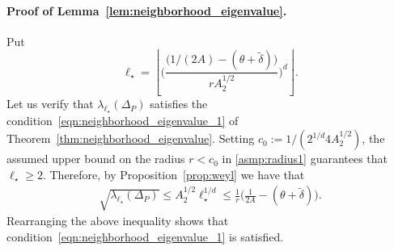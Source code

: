 \documentclass[twoside]{article}
\newcommand{\floor}[1]{\left\lfloor #1 \right\rfloor}
\newcommand{\1}{\mathbf{1}}
\newcommand{\wt}[1]{\widetilde{#1}}
\theoremstyle{definition}
\theoremstyle{remark}
\begin{document}
\paragraph{Proof of Lemma~\ref{lem:neighborhood_eigenvalue}.}
Put
\begin{equation*}
\ell_{\star} = \floor{\biggl(\frac{\bigl(1/(2A) - (\theta + \wt{\delta})\bigr)}{rA_2^{1/2}}\biggr)^d}.
\end{equation*}
Let us verify that $\lambda_{\ell_{\star}}(\Delta_P)$ satisfies the condition~\ref{eqn:neighborhood_eigenvalue_1} of Theorem~\ref{thm:neighborhood_eigenvalue}. Setting $c_0 := 1/(2^{1/d}4A_2^{1/2})$, the assumed upper bound on the radius $r < c_0$ in \ref{asmp:radius1} guarantees that $\ell_{\star} \geq 2$. Therefore, by Proposition~\ref{prop:weyl} we have that
\begin{align*}
\sqrt{\lambda_{\ell_{\star}}(\Delta_P)} \leq A_2^{1/2}\ell_{\star}^{1/d} \leq  \frac{1}{r}\biggl(\frac{1}{2A} - (\theta + \wt{\delta})\biggr).
\end{align*}
Rearranging the above inequality shows that condition~\eqref{eqn:neighborhood_eigenvalue_1} is satisfied. 
\end{document}
